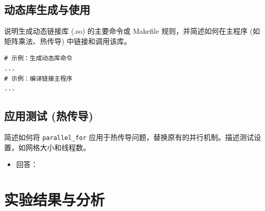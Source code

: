 \documentclass{SYSUReport}
\begin{document}
\subsection{动态库生成与使用}
说明生成动态链接库 (.so) 的主要命令或 Makefile 规则，并简述如何在主程序 (如矩阵乘法、热传导) 中链接和调用该库。
\begin{verbatim}
# 示例：生成动态库命令
...
# 示例：编译链接主程序
...
\end{verbatim}
\subsection{应用测试 (热传导)}
简述如何将 \texttt{parallel\_for} 应用于热传导问题，替换原有的并行机制。描述测试设置，如网格大小和线程数。
\begin{itemize}
    \item 回答：
\end{itemize}

\section{实验结果与分析}
\end{document}
